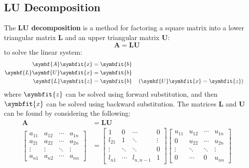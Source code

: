 \documentclass{article}
\begin{document}
\subsection{LU Decomposition}
The \textbf{LU decomposition} is a method for factoring a square matrix into a lower triangular matrix \(\symbf{L}\) and an upper triangular matrix \(\symbf{U}\):
\begin{equation*}
    \symbf{A} = \symbf{L} \symbf{U}
\end{equation*}
to solve the linear system:
\begin{align*}
    \symbf{A} \symbfit{x}           & = \symbfit{b}                                                         \\
    \symbf{L} \symbf{U} \symbfit{x} & = \symbfit{b}                                                         \\
    \symbf{L} \symbfit{z}           & = \symbfit{b} &  & \left( \symbf{U} \symbfit{x} = \symbfit{z} \right)
\end{align*}
where \(\symbfit{z}\) can be solved using forward substitution, and then \(\symbfit{x}\) can be solved using backward substitution.
The matrices \(\symbf{L}\) and \(\symbf{U}\) can be found by considering the following:
\begin{align*}
    \symbf{A}                            & = \symbf{L} \symbf{U} \\
    \begin{bmatrix*}
        a_{11} & a_{12} & \cdots & a_{1n} \\
        a_{21} & a_{22} & \cdots & a_{2n} \\
        \vdots & \vdots & \ddots & \vdots \\
        a_{n1} & a_{n2} & \cdots & a_{nn}
    \end{bmatrix*} & =
    \begin{bmatrix*}
        1 & 0      & \cdots & 0      \\
        l_{21} & 1 & \ddots & \vdots      \\
        \vdots & \ddots & \ddots & 0 \\
        l_{n1} & \cdots & l_{n,n-1} & 1
    \end{bmatrix*}
    \begin{bmatrix*}
        u_{11} & u_{12} & \cdots & u_{1n} \\
        0      & u_{22} & \cdots & u_{2n} \\
        \vdots & \ddots & \ddots & \vdots \\
        0      & \cdots & 0      & u_{nn}
    \end{bmatrix*}
\end{align*}
\end{document}

